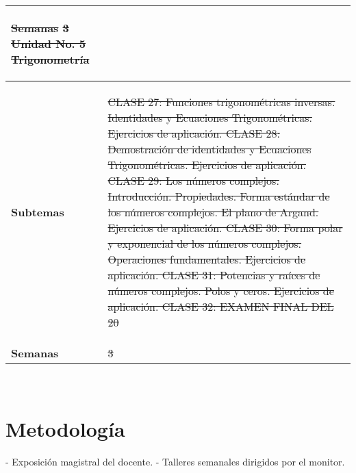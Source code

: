 \documentclass[11pt]{article}
\providecommand{\DIFaddtex}[1]{{\protect\color{blue}\uwave{#1}}} %
\providecommand{\DIFdeltex}[1]{{\protect\color{red}\sout{#1}}}                      %
\providecommand{\DIFaddbegin}{} %
\providecommand{\DIFaddend}{} %
\providecommand{\DIFdelbegin}{} %
\providecommand{\DIFdelend}{} %
\providecommand{\DIFadd}[1]{\texorpdfstring{\DIFaddtex{#1}}{#1}} %
\providecommand{\DIFdel}[1]{\texorpdfstring{\DIFdeltex{#1}}{}} %
\newcommand{\DIFscaledelfig}{0.5}
\newlength{\DIFdelgraphicswidth} %
\newlength{\DIFdelgraphicsheight} %
\newcommand{\DIFaddincludegraphics}[2][]{{\color{blue}\fbox{\DIFOincludegraphics[#1]{#2}}}} %
\newcommand{\DIFdelincludegraphics}[2][]{%
\sbox{\DIFdelgraphicsbox}{\DIFOincludegraphics[#1]{#2}}%
\settoboxwidth{\DIFdelgraphicswidth}{\DIFdelgraphicsbox} %
\settoboxtotalheight{\DIFdelgraphicsheight}{\DIFdelgraphicsbox} %
\scalebox{\DIFscaledelfig}{%
\parbox[b]{\DIFdelgraphicswidth}{\usebox{\DIFdelgraphicsbox}\\[-\baselineskip] \rule{\DIFdelgraphicswidth}{0em}}\llap{\resizebox{\DIFdelgraphicswidth}{\DIFdelgraphicsheight}{%
\setlength{\unitlength}{\DIFdelgraphicswidth}%
\begin{picture}(1,1)%
\thicklines\linethickness{2pt} %
{\color[rgb]{1,0,0}\put(0,0){\framebox(1,1){}}}%
{\color[rgb]{1,0,0}\put(0,0){\line( 1,1){1}}}%
{\color[rgb]{1,0,0}\put(0,1){\line(1,-1){1}}}%
\end{picture}%
}\hspace*{3pt}}} %
} %
\DeclareRobustCommand{\DIFaddbegin}{\DIFOaddbegin \let\includegraphics\DIFaddincludegraphics} %
\DeclareRobustCommand{\DIFaddend}{\DIFOaddend \let\includegraphics\DIFOincludegraphics} %
\DeclareRobustCommand{\DIFdelbegin}{\DIFOdelbegin \let\includegraphics\DIFdelincludegraphics} %
\DeclareRobustCommand{\DIFdelend}{\DIFOaddend \let\includegraphics\DIFOincludegraphics} %
\begin{document}
\begin{tabular}{R{0.16\textwidth} L{0.7\textwidth}}
\begin{description}
{}
\end{description}%
\textbf{\DIFdel{Semanas}} %
\DIFdel{3 
}%
\textbf{\DIFdel{Unidad No. 5}} %
\DIFdel{Trigonometría 
 }\DIFdelend \DIFaddbegin \DIFadd{illuminati 
 }\DIFaddend \\ 
\midrule\textbf{Subtemas} & 
\begin{description}
 \item \DIFdelbegin \DIFdel{CLASE 27: Funciones trigonométricas inversas. Identidades y Ecuaciones Trigonométricas. Ejercicios de aplicación. CLASE 28: Demostración de identidades y Ecuaciones Trigonométricas. Ejercicios de aplicación. CLASE 29: Los números complejos. Introducción. Propiedades. Forma estándar de los números complejos. El plano de Argand. Ejercicios de aplicación. CLASE 30: Forma polar y exponencial de los números complejos. Operaciones fundamentales. Ejercicios de aplicación. CLASE 31: Potencias y raíces de números complejos. Polos y ceros. Ejercicios de aplicación. CLASE 32: EXAMEN FINAL DEL 20%
}\DIFdelend \DIFaddbegin \DIFadd{a 
}\DIFaddend \end{description}
 \\ 
\textbf{Semanas} & \DIFdelbegin \DIFdel{3 
}\DIFdelend \DIFaddbegin \DIFadd{1 
}\DIFaddend \end{tabular} 
 \\ 


\section*{Metodología}

- Exposición magistral del docente. - Talleres semanales dirigidos por el monitor.

\end{document}
